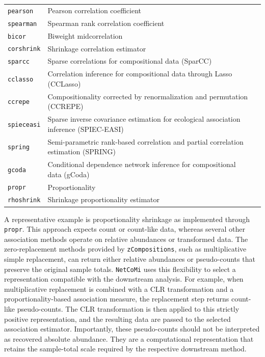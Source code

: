 \begin{table}[!htb]
\begin{tabularx}{\textwidth}{p{2cm} p{7.3cm} p{5.3cm}}
\texttt{pearson} & Pearson correlation coefficient & \citep{pearson1895vii} \\
\texttt{spearman} & Spearman rank correlation coefficient & \citep{spearman1961proof} \\
\texttt{bicor} & Biweight midcorrelation & \citep{wilcox2012introduction} \\
\texttt{corshrink} & Shrinkage correlation estimator & \citep{schafer2005shrinkage} \\
\texttt{sparcc} & Sparse correlations for compositional data (SparCC) & \citep{friedman2012inferring} \\
\texttt{cclasso} & Correlation inference for compositional data through Lasso (CCLasso) & \citep{fang2015cclasso} \\
\texttt{ccrepe} & Compositionality corrected by renormalization and permutation (CCREPE) & \citep{faust2012microbial} \\
\texttt{spieceasi} & Sparse inverse covariance estimation for ecological association inference (SPIEC-EASI) & \citep{kurtz2015sparse} \\
\texttt{spring} & Semi-parametric rank-based correlation and partial correlation estimation (SPRING) & \citep{yoon2020sparse} \\
\texttt{gcoda} & Conditional dependence network inference for compositional data (gCoda) & \citep{fang2017gcoda} \\
\texttt{propr} & Proportionality & \citep{quinn2017propr} \\
\texttt{rhoshrink} & Shrinkage proportionality estimator & \citep{badri2020shrinkage} \\
\bottomrule
\end{tabularx}
\end{table}

A representative example is proportionality shrinkage as implemented through \texttt{propr}. This approach expects count or count-like data, whereas several other association methods operate on relative abundances or transformed data. The zero-replacement methods provided by \texttt{zCompositions}, such as multiplicative simple replacement, can return either relative abundances or pseudo-counts that preserve the original sample totals. \texttt{NetCoMi} uses this flexibility to select a representation compatible with the downstream analysis. For example, when multiplicative replacement is combined with a CLR transformation and a proportionality-based association measure, the replacement step returns count-like pseudo-counts. The CLR transformation is then applied to this strictly positive representation, and the resulting data are passed to the selected association estimator. Importantly, these pseudo-counts should not be interpreted as recovered absolute abundance. They are a computational representation that retains the sample-total scale required by the respective downstream method.

